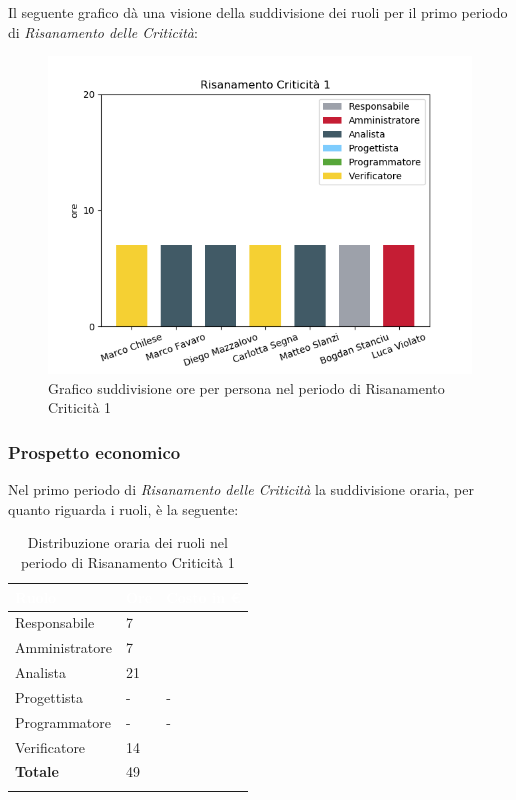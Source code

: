 Il seguente grafico dà una visione della suddivisione dei ruoli per il primo periodo di \textit{Risanamento delle Criticità}:
\begin{figure}[H]
  \centering
  \includegraphics[width=1\linewidth]{./images/fig_rc1.png}
  \caption{Grafico suddivisione ore per persona nel periodo di Risanamento Criticità 1}
  \label{fig:grafico suddivione ruoli rc1}
\end{figure}

\subsubsection{Prospetto economico}
Nel primo periodo di \textit{Risanamento delle Criticità} la suddivisione oraria, per quanto riguarda i ruoli, è la seguente: 


\begin{longtable}{| C{.30\textwidth}| C{.15\textwidth}| C{.20\textwidth}|}
\hline
{}\textbf{\textcolor{white}{Ruolo}} & \textbf{\textcolor{white}{Ore}} & \textbf{\textcolor{white}{Costo in \euro}} \\
\hline 
Responsabile & 7 &  \\
\hline
{}Amministratore & 7 &  \\
\hline
Analista & 21 &  \\
\hline
{}Progettista & - & - \\
\hline
Programmatore & - & - \\
\hline
{}Verificatore & 14 & \\
\hline
\textbf{Totale} & 49 &  \\
\hline


\caption{Distribuzione oraria dei ruoli nel periodo di Risanamento Criticità 1}
\label{Distribuzione oraria del periodo di rc1}
\end{longtable}

